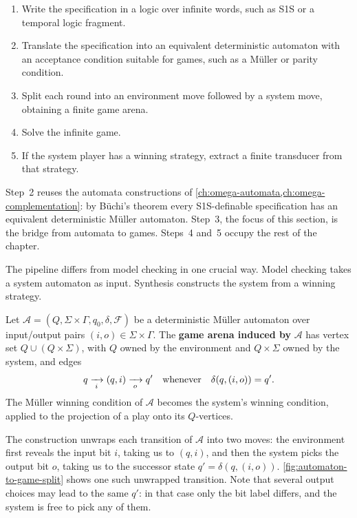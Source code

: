 \begin{formaldetails}[Pipeline]
\begin{enumerate}[label=\textbf{Step \arabic*.}, leftmargin=2cm]
  \item Write the specification in a logic over infinite words, such as
        S1S or a temporal logic fragment.
  \item Translate the specification into an equivalent deterministic
        automaton with an acceptance condition suitable for games, such
        as a M\"uller or parity condition.
  \item Split each round into an environment move followed by a system
        move, obtaining a finite game arena.
  \item Solve the infinite game.
  \item If the system player has a winning strategy, extract a finite
        transducer from that strategy.
\end{enumerate}
\end{formaldetails}

Step~2 reuses the automata constructions of
\cref{ch:omega-automata,ch:omega-complementation}: by B\"uchi's theorem
every S1S-definable specification has an equivalent deterministic
M\"uller automaton.  Step~3, the focus of this section, is the bridge
from automata to games.  Steps~4 and~5 occupy the rest of the chapter.

The pipeline differs from model checking in one crucial way.  Model
checking takes a system automaton as input.  Synthesis constructs the
system from a winning strategy.

\begin{definition}
\label{def:automaton-to-game}
Let $\mathcal{A}=(Q,\Sigma\times\Gamma,q_0,\delta,\mathcal{F})$ be a
deterministic M\"uller automaton over input/output pairs
$(i,o)\in\Sigma\times\Gamma$.  The \textbf{game arena induced by}
$\mathcal{A}$ has vertex set $Q\cup(Q\times\Sigma)$, with $Q$ owned by
the environment and $Q\times\Sigma$ owned by the system, and edges
\[
  q \xrightarrow[{\;i\;}]{} (q,i) \xrightarrow[{\;o\;}]{} q'
  \quad\text{whenever}\quad
  \delta(q,(i,o))=q'.
\]
The M\"uller winning condition of $\mathcal{A}$ becomes the system's
winning condition, applied to the projection of a play onto its $Q$-vertices.
\end{definition}

The construction unwraps each transition of $\mathcal{A}$ into two
moves: the environment first reveals the input bit $i$, taking us to
$(q,i)$, and then the system picks the output bit $o$, taking us to the
successor state $q'=\delta(q,(i,o))$.  \cref{fig:automaton-to-game-split}
shows one such unwrapped transition.  Note that several output choices
may lead to the same $q'$: in that case only the bit label differs, and
the system is free to pick any of them.

